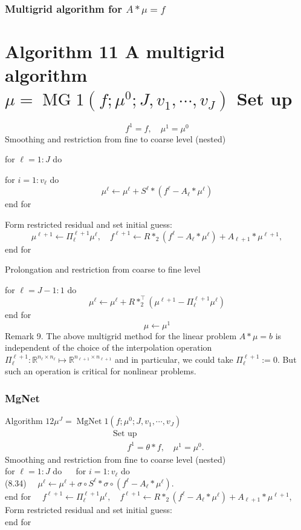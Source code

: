 \documentclass[10pt]{article}
\begin{document}
\subsubsection{Multigrid algorithm for $A * \mu=f$}
\section{Algorithm 11 A multigrid algorithm $\mu=\operatorname{MG} 1\left(f ; \mu^{0} ; J, v_{1}, \cdots, v_{J}\right)$ 
 Set up}
$$
f^{1}=f, \quad \mu^{1}=\mu^{0}
$$
Smoothing and restriction from fine to coarse level (nested)

for $\ell=1: J$ do

for $i=1: v_{\ell}$ do
$$
\mu^{\ell} \leftarrow \mu^{\ell}+S^{\ell} *\left(f^{\ell}-A_{\ell} * \mu^{\ell}\right)
$$
end for

Form restricted residual and set initial guess:
$$
\mu^{\ell+1} \leftarrow \Pi_{\ell}^{\ell+1} \mu^{\ell}, \quad f^{\ell+1} \leftarrow R *_{2}\left(f^{\ell}-A_{\ell} * \mu^{\ell}\right)+A_{\ell+1} * \mu^{\ell+1},
$$
end for

Prolongation and restriction from coarse to fine level

for $\ell=J-1: 1$ do
$$
\mu^{\ell} \leftarrow \mu^{\ell}+R *_{2}^{\top}\left(\mu^{\ell+1}-\Pi_{\ell}^{\ell+1} \mu^{\ell}\right)
$$
end for
$$
\mu \leftarrow \mu^{1}
$$
Remark 9. The above multigrid method for the linear problem $A * \mu=b$ is independent of the choice of the interpolation operation $\Pi_{\ell}^{\ell+1}: \mathbb{R}^{n_{\ell} \times n_{\ell}} \mapsto \mathbb{R}^{n_{\ell+1} \times n_{\ell+1}}$ and in particular, we could take $\Pi_{\ell}^{\ell+1}:=0$. But such an operation is critical for nonlinear problems.

\subsubsection{MgNet}
Algorithm $12 \mu^{J}=\operatorname{MgNet} 1\left(f ; \mu^{0} ; J, v_{1}, \cdots, v_{J}\right)$
\[ \begin{array}{l}\text { Set up } \\ \qquad f^{1}=\theta * f, \quad \mu^{1}=\mu^{0} .\end{array} \]
Smoothing and restriction from fine to coarse level (nested)\\
for $\ell=1: J$ do $\quad$ for $i=1: v_{\ell}$ do\\
(8.34) $\quad \mu^{\ell} \leftarrow \mu^{\ell}+\sigma \circ S^{\ell} * \sigma \circ\left(f^{\ell}-A_{\ell} * \mu^{\ell}\right) .$\\
end for $\quad f^{\ell+1} \leftarrow \Pi_{\ell}^{\ell+1} \mu^{\ell}, \quad f^{\ell+1} \leftarrow R *_{2}\left(f^{\ell}-A_{\ell} * \mu^{\ell}\right)+A_{\ell+1} * \mu^{\ell+1}$,\\
Form restricted residual and set initial guess:\\
end for
\end{document}
